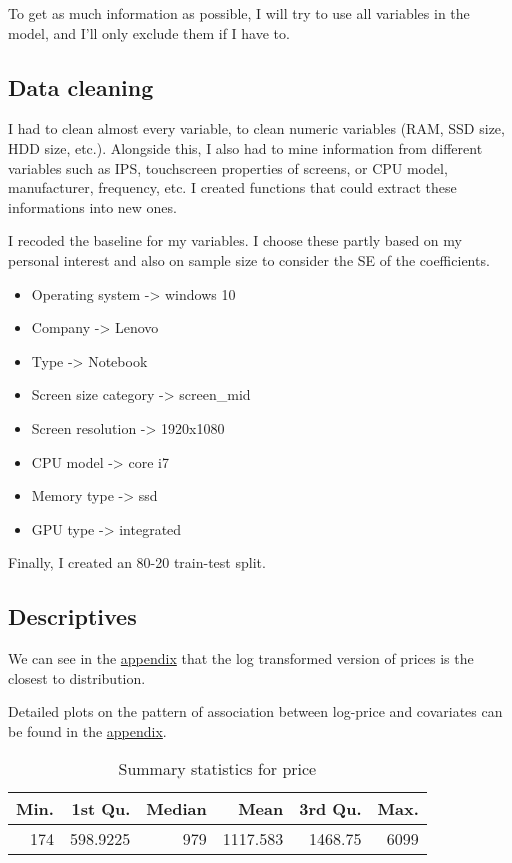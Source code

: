 \documentclass[
]{article}
\providecommand{\tightlist}{%
  \setlength{\itemsep}{0pt}\setlength{\parskip}{0pt}}
\begin{document}
To get as much information as possible, I will try to use all variables
in the model, and I'll only exclude them if I have to.

\hypertarget{data-cleaning}{%
\subsection{Data cleaning}\label{data-cleaning}}

I had to clean almost every variable, to clean numeric variables (RAM,
SSD size, HDD size, etc.). Alongside this, I also had to mine
information from different variables such as IPS, touchscreen properties
of screens, or CPU model, manufacturer, frequency, etc. I created
functions that could extract these informations into new ones.

I recoded the baseline for my variables. I choose these partly based on
my personal interest and also on sample size to consider the SE of the
coefficients.

\begin{itemize}
\tightlist
\item
  Operating system -\textgreater{} windows 10
\item
  Company -\textgreater{} Lenovo
\item
  Type -\textgreater{} Notebook
\item
  Screen size category -\textgreater{} screen\_mid
\item
  Screen resolution -\textgreater{} 1920x1080
\item
  CPU model -\textgreater{} core i7
\item
  Memory type -\textgreater{} ssd
\item
  GPU type -\textgreater{} integrated
\end{itemize}

Finally, I created an 80-20 train-test split.

\hypertarget{descriptives}{%
\subsection{Descriptives}\label{descriptives}}

We can see in the \protect\hyperlink{appendix}{appendix} that the log
transformed version of prices is the closest to distribution.

Detailed plots on the pattern of association between log-price and
covariates can be found in the \protect\hyperlink{appendix}{appendix}.

\begin{table}

\caption{\label{tab:unnamed-chunk-6}Summary statistics for price}
\centering
\begin{tabular}[t]{r|r|r|r|r|r}
\hline
Min. & 1st Qu. & Median & Mean & 3rd Qu. & Max.\\
\hline
174 & 598.9225 & 979 & 1117.583 & 1468.75 & 6099\\
\hline
\end{tabular}
\end{table}
\end{document}
